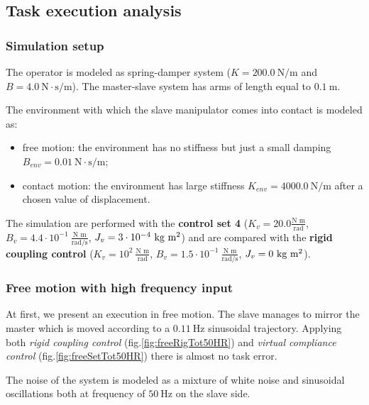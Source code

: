 \subsection{Task execution analysis}

\subsubsection*{Simulation setup}

The operator is modeled as spring-damper system ($ K=200.0 \ \text{N/m} $ and $ B=4.0 \ \text{N}\cdot\text{s}/\text{m} $). The master-slave system has arms of length equal to $ 0.1 \ \text{m} $. 

The environment with which the slave manipulator comes into contact is modeled as:
\begin{itemize}
	\item free motion: the environment has no stiffness but just a small damping $ B_{env}=0.01 \ \text{N}\cdot\text{s}/\text{m} $;
	\item contact motion: the environment has large stiffness $ K_{env} = 4000.0 \ \text{N/m} $ after a chosen value of displacement.
\end{itemize}

The simulation are performed with the \textbf{control set 4} ($ K_v = 20.0 \frac{\text{N m}}{\text{rad}} $, $ B_v = 4.4\cdot 10^{-1} \ \frac{\text{N m}}{\text{rad/s}}$, $ J_v = 3\cdot 10^{-4} \ \text{kg m\textsuperscript{2}}$) and are compared with the \textbf{rigid coupling control} ($K_v = 10^{2} \ \frac{\text{N m}}{\text{rad}} $, $B_v = 1.5\cdot 10^{-1} \ \frac{\text{N m}}{\text{rad/s}}$, $J_v =  0 \ \text{kg m\textsuperscript{2}} $).

\subsubsection{Free motion with high frequency input}

At first, we present an execution in free motion. The slave manages to mirror the master which is moved according to a $ 0.11 \ \text{Hz} $ sinusoidal trajectory. Applying both \textsl{rigid coupling control} (fig.\ref{fig:freeRigTot50HR}) and \textsl{virtual compliance control} (fig.\ref{fig:freeSetTot50HR}) there is almost no task error.

The noise of the system is modeled as a mixture of white noise and sinusoidal oscillations both at frequency of $50 \ \text{Hz}$ on the slave side.

